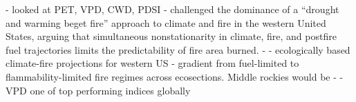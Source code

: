 \documentclass[11p]{article}
\begin{document}
\begin{table}
{- \citet{abatzoglouImpactAnthropogenicClimate2016} looked at PET, VPD, CWD, PDSI
- \citet{mckenzieClimateChangeEcohydrology2017} challenged the dominance of a “drought and warming beget fire” approach to climate and fire in the western United States, arguing that simultaneous nonstationarity in climate, fire, and postfire fuel trajectories limits the predictability of fire area burned.
- \citet{littellClimateChangeFuture2018} - ecologically based climate-fire projections for western US - gradient from fuel-limited to flammability-limited fire regimes across ecosections. Middle rockies would be
- \citet{zacharakisEnvironmentalForestFire2023} - VPD one of top performing indices globally


}
\end{table}
\end{document}
